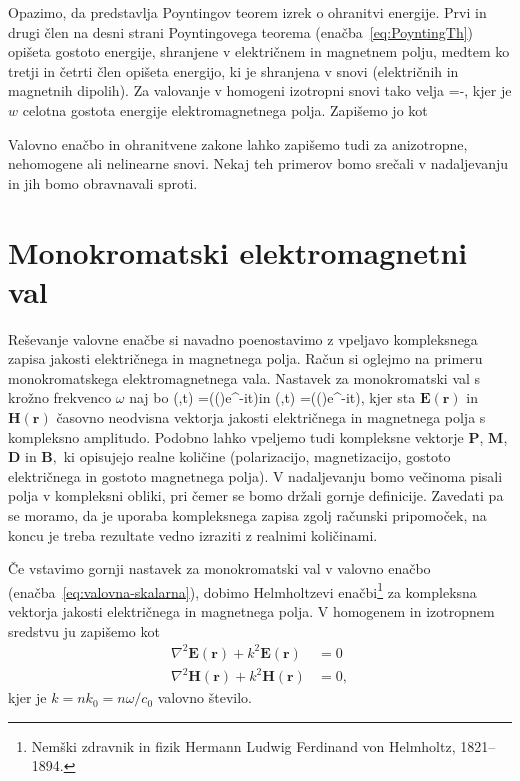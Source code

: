 Opazimo, da predstavlja Poyntingov teorem
izrek o ohranitvi energije. Prvi in drugi člen na desni strani Poyntingovega 
teorema (enačba~\ref{eq:PoyntingTh}) opišeta gostoto energije, shranjene v električnem in magnetnem
polju, medtem ko tretji in četrti člen opišeta energijo,
ki je shranjena v snovi (električnih in magnetnih dipolih). Za valovanje
v homogeni izotropni snovi tako velja
\beq
\nabla\cdot{}=-,
\eeq
kjer je $w$ celotna
gostota energije elektromagnetnega polja. Zapišemo jo kot 

Valovno enačbo in ohranitvene zakone lahko zapišemo tudi za anizotropne,
nehomogene ali nelinearne snovi. Nekaj teh primerov bomo srečali v nadaljevanju
in jih bomo obravnavali sproti.

\section{Monokromatski elektromagnetni val}

Reševanje valovne enačbe si navadno poenostavimo z vpeljavo kompleksnega
zapisa jakosti električnega in magnetnega polja. Račun si
oglejmo na primeru monokromatskega elektromagnetnega vala. Nastavek
za monokromatski val s krožno frekvenco $\omega$ naj bo
\beq
{}(,t)  =\mathfrak{\Re}(()e^{-i\omega t})\qquad \textrm{in} \qquad
{}(,t)  =\mathfrak{\Re}(()e^{-i\omega t}),
\eeq
kjer sta $\mathbf E(\mathbf{r})$ in $\mathbf H(\mathbf{r})$ časovno
neodvisna vektorja jakosti električnega in 
magnetnega polja s kompleksno
amplitudo. Podobno lahko vpeljemo tudi kompleksne vektorje $\mathbf{P}$,
$\mathbf{M}$, $\mathbf{D}$ in $\mathbf{B},$ ki opisujejo realne količine (polarizacijo,
magnetizacijo, gostoto električnega in gostoto magnetnega polja).
V nadaljevanju bomo večinoma pisali polja v kompleksni obliki, pri
čemer se bomo držali gornje definicije. Zavedati pa se moramo, da
je uporaba kompleksnega zapisa zgolj računski pripomoček, na koncu
je treba rezultate vedno izraziti z realnimi količinami. 

Če vstavimo gornji nastavek za monokromatski val v valovno enačbo
(enačba~\ref{eq:valovna-skalarna}), dobimo Helmholtzevi
enačbi\footnote{Nemški zdravnik in fizik Hermann Ludwig Ferdinand von Helmholtz, 1821--1894.} 
za kompleksna vektorja jakosti električnega in magnetnega polja.
V homogenem in izotropnem sredstvu ju zapišemo kot
\begin{align}
\nabla^{2}\mathbf{E}(\mathbf{r})+k^{2}\mathbf{E}(\mathbf{r}) &=0\label{eq:Helmholtz}\\
\nabla^{2}\mathbf{H}(\mathbf{r})+k^{2}\mathbf{H}(\mathbf{r}) &=0,
\end{align}
kjer je $k=nk_{0}=n\omega/c_{0}$ valovno število. 

